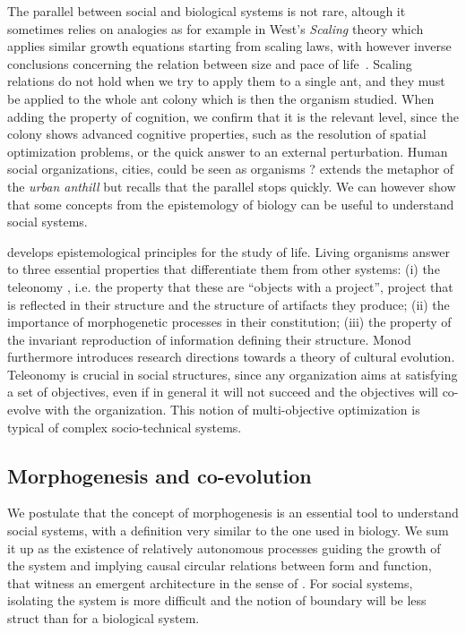 \documentclass[letterpaper]{article}
\begin{document}
The parallel between social and biological systems is not rare, altough it sometimes relies on analogies as for example in West's \emph{Scaling} theory which applies similar growth equations starting from scaling laws, with however inverse conclusions concerning the relation between size and pace of life~\citep{bettencourt2007growth}. Scaling relations do not hold when we try to apply them to a single ant, and they must be applied to the whole ant colony which is then the organism studied. When adding the property of cognition, we confirm that it is the relevant level, since the colony shows advanced cognitive properties, such as the resolution of spatial optimization problems, or the quick answer to an external perturbation. Human social organizations, cities, could be seen as organisms ? \cite{banos2013pour} extends the metaphor of the \emph{urban anthill} but recalls that the parallel stops quickly. We can however show that some concepts from the epistemology of biology can be useful to understand social systems.


\cite{monod1970hasard} develops epistemological principles for the study of life. Living organisms answer to three essential properties that differentiate them from other systems: (i) the teleonomy , i.e. the property that these are ``objects with a project'', project that is reflected in their structure and the structure of artifacts they produce; (ii) the importance of morphogenetic processes in their constitution; (iii) the property of the invariant reproduction of information defining their structure. Monod furthermore introduces research directions towards a theory of cultural evolution. Teleonomy is crucial in social structures, since any organization aims at satisfying a set of objectives, even if in general it will not succeed and the objectives will co-evolve with the organization. This notion of multi-objective optimization is typical of complex socio-technical systems.



\subsection{Morphogenesis and co-evolution}

We postulate that the concept of morphogenesis is an essential tool to understand social systems, with a definition very similar to the one used in biology. We sum it up as the existence of relatively autonomous processes guiding the growth of the system and implying causal circular relations between form and function, that witness an emergent architecture in the sense of \cite{doursat2012morphogenetic}. For social systems, isolating the system is more difficult and the notion of boundary will be less struct than for a biological system. %
\end{document}
